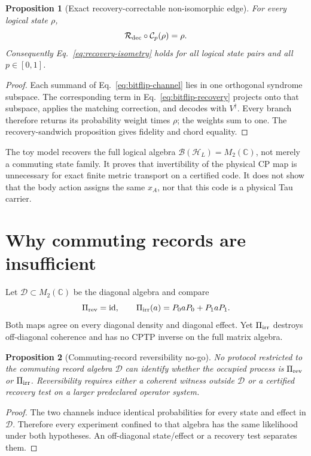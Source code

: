 \documentclass[11pt]{article}
\newtheorem{proposition}{Proposition}
\newcommand{\id}{\operatorname{id}}
\begin{document}
\begin{proposition}[Exact recovery-correctable non-isomorphic edge]
For every logical state \(\rho\),
\begin{equation}
 \mathcal R_{\rm dec}\circ\mathcal C_p(\rho)=\rho.
 \label{eq:toy-recovery-identity}
\end{equation}
Consequently Eq.~\eqref{eq:recovery-isometry} holds for all logical state
pairs and all \(p\in[0,1]\).
\end{proposition}
\begin{proof}
Each summand of Eq.~\eqref{eq:bitflip-channel} lies in one orthogonal syndrome
subspace.  The corresponding term in Eq.~\eqref{eq:bitflip-recovery} projects
onto that subspace, applies the matching correction, and decodes with \(V^\dagger\).
Every branch therefore returns its probability weight times \(\rho\); the
weights sum to one.  The recovery-sandwich proposition gives fidelity and
chord equality.
\end{proof}

The toy model recovers the full logical algebra
\(\mathcal B(\mathcal H_L)=M_2(\mathbb C)\), not merely a commuting state
family.  It proves that invertibility of the physical CP map is unnecessary
for exact finite metric transport on a certified code.  It does not show that
the body action assigns the same \(x_A\), nor that this code is a physical Tau
carrier.

\section{Why commuting records are insufficient}

Let \(\mathcal D\subset M_2(\mathbb C)\) be the diagonal algebra and compare
\begin{equation}
 \Pi_{\rm rev}=\id,
 \qquad
 \Pi_{\rm irr}(a)=P_0aP_0+P_1aP_1.
 \label{eq:dephasing-control}
\end{equation}
Both maps agree on every diagonal density and diagonal effect.  Yet
\(\Pi_{\rm irr}\) destroys off-diagonal coherence and has no CPTP inverse on
the full matrix algebra.

\begin{proposition}[Commuting-record reversibility no-go]
No protocol restricted to the commuting record algebra \(\mathcal D\) can
identify whether the occupied process is \(\Pi_{\rm rev}\) or
\(\Pi_{\rm irr}\).  Reversibility requires either a coherent witness outside
\(\mathcal D\) or a certified recovery test on a larger predeclared operator
system.
\end{proposition}
\begin{proof}
The two channels induce identical probabilities for every state and effect in
\(\mathcal D\).  Therefore every experiment confined to that algebra has the
same likelihood under both hypotheses.  An off-diagonal state/effect or a
recovery test separates them.
\end{proof}
\end{document}
